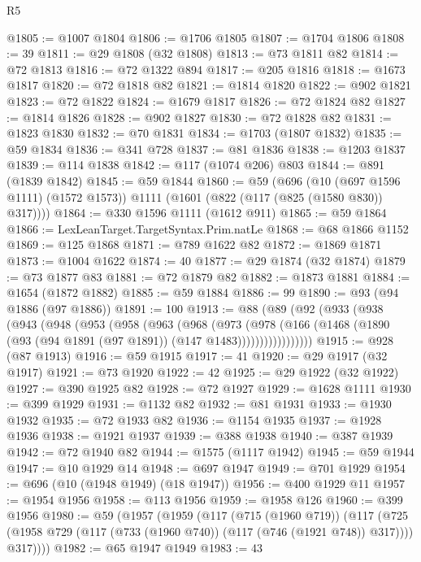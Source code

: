 \begin{lexlean}{R5}
\begin{coremodule}
@1805 := @1007 @1804
@1806 := @1706 @1805
@1807 := @1704 @1806
@1808 := 39
@1811 := @29 @1808 (@32 @1808)
@1813 := @73 @1811 @82
@1814 := @72 @1813
@1816 := @72 @1322 @894
@1817 := @205 @1816
@1818 := @1673 @1817
@1820 := @72 @1818 @82
@1821 := @1814 @1820
@1822 := @902 @1821
@1823 := @72 @1822
@1824 := @1679 @1817
@1826 := @72 @1824 @82
@1827 := @1814 @1826
@1828 := @902 @1827
@1830 := @72 @1828 @82
@1831 := @1823 @1830
@1832 := @70 @1831
@1834 := @1703 (@1807 @1832)
@1835 := @59 @1834
@1836 := @341 @728
@1837 := @81 @1836
@1838 := @1203 @1837
@1839 := @114 @1838
@1842 := @117 (@1074 @206) @803
@1844 := @891 (@1839 @1842)
@1845 := @59 @1844
@1860 := @59
    (@696
      (@10 (@697 @1596 @1111) (@1572 @1573))
      @1111
      (@1601 (@822 (@117 (@825 (@1580 @830)) @317))))
@1864 := @330 @1596 @1111 (@1612 @911)
@1865 := @59 @1864
@1866 := LexLeanTarget.TargetSyntax.Prim.natLe
@1868 := @68 @1866 @1152
@1869 := @125 @1868
@1871 := @789 @1622 @82
@1872 := @1869 @1871
@1873 := @1004 @1622
@1874 := 40
@1877 := @29 @1874 (@32 @1874)
@1879 := @73 @1877 @83
@1881 := @72 @1879 @82
@1882 := @1873 @1881
@1884 := @1654 (@1872 @1882)
@1885 := @59 @1884
@1886 := 99
@1890 := @93 (@94 @1886 (@97 @1886))
@1891 := 100
@1913 := @88
    (@89
      (@92
        (@933
          (@938
            (@943
              (@948
                (@953
                  (@958
                    (@963
                      (@968
                        (@973
                          (@978
                            (@166
                              (@1468
                                (@1890 (@93 (@94 @1891 (@97 @1891)) (@147 @1483)))))))))))))))))
@1915 := @928 (@87 @1913)
@1916 := @59 @1915
@1917 := 41
@1920 := @29 @1917 (@32 @1917)
@1921 := @73 @1920
@1922 := 42
@1925 := @29 @1922 (@32 @1922)
@1927 := @390 @1925 @82
@1928 := @72 @1927
@1929 := @1628 @1111
@1930 := @399 @1929
@1931 := @1132 @82
@1932 := @81 @1931
@1933 := @1930 @1932
@1935 := @72 @1933 @82
@1936 := @1154 @1935
@1937 := @1928 @1936
@1938 := @1921 @1937
@1939 := @388 @1938
@1940 := @387 @1939
@1942 := @72 @1940 @82
@1944 := @1575 (@1117 @1942)
@1945 := @59 @1944
@1947 := @10 @1929 @14
@1948 := @697 @1947
@1949 := @701 @1929
@1954 := @696 (@10 (@1948 @1949) (@18 @1947))
@1956 := @400 @1929 @11
@1957 := @1954 @1956
@1958 := @113 @1956
@1959 := @1958 @126
@1960 := @399 @1956
@1980 := @59
    (@1957
      (@1959
        (@117
          (@715 (@1960 @719))
          (@117
            (@725 (@1958 @729 (@117 (@733 (@1960 @740)) (@117 (@746 (@1921 @748)) @317))))
            @317))))
@1982 := @65 @1947 @1949
@1983 := 43

\end{coremodule}
\end{lexlean}
